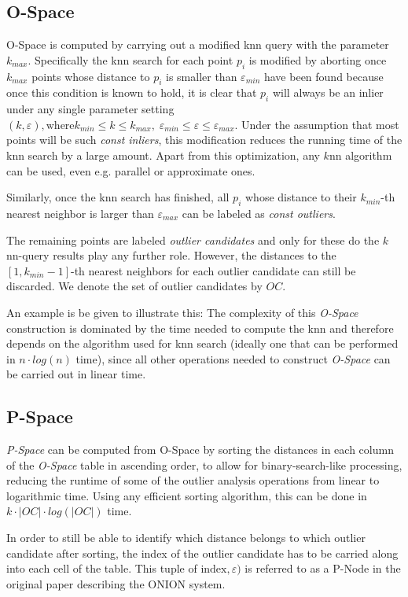 \documentclass[runningheads]{llncs}
\begin{document}
\subsection{O-Space}
O-Space is computed by carrying out a modified knn query with the parameter $k_{max}$. Specifically  the knn search for each point $p_i$ is modified by aborting once $k_{max}$ points whose distance to $p_i$ is smaller than $\varepsilon_{min}$ have been found because once this condition is known to hold, it is clear that $p_i$ will always be an inlier under any single parameter setting $(k,\varepsilon), \text{where} k_{min}\leq k \leq k_{max},\; \varepsilon_{min}\leq \varepsilon \leq \varepsilon_{max}$. Under the assumption that most points will be such \emph{const inliers}, this modification reduces the running time of the knn search by a large amount. Apart from this optimization, any $k$nn algorithm can be used, even e.g. parallel or approximate ones.

Similarly, once the knn search has finished, all $p_i$ whose distance to their $k_{min}$-th nearest neighbor is larger than $\varepsilon_{max}$ can be labeled as \emph{const outliers}.

The remaining points are labeled \emph{outlier candidates} and only for these do the $k$nn-query results play any further role.  However, the distances to the $[1,k_{min}-1]$-th nearest neighbors for each outlier candidate can still be discarded. We denote the set of outlier candidates by $OC$.

An example is be given to illustrate this:
The complexity of this \emph{O-Space} construction is dominated by the time needed to compute the knn and therefore depends on the algorithm used for knn search (ideally one that can be performed in $n \cdot log(n)$ time), since all other operations needed to construct \emph{O-Space} can be carried out in linear time.
\subsection{P-Space}
\emph{P-Space} can be computed from O-Space by sorting the distances in each column of the \emph{O-Space} table in ascending order, to allow for binary-search-like processing, reducing the runtime of some of the outlier analysis operations from linear to logarithmic time. Using any efficient sorting algorithm, this can be done in $k \cdot |OC| \cdot log(|OC|)$ time. 

In order to still be able to identify which distance belongs to which outlier candidate after sorting, the index of the outlier candidate has to be carried along into each cell of the table. This tuple of $\text{index},\varepsilon)$ is referred to as a P-Node in the original paper\cite{onion} describing the ONION system.
\end{document}

